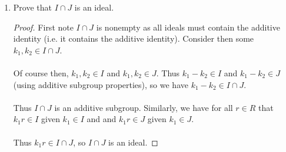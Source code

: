 \documentclass[12pt]{article}
\newenvironment{ex}[2][Exercise]{\begin{trivlist}
\item[\hskip \labelsep {\bfseries #1}\hskip \labelsep {\bfseries #2.}]}{\end{trivlist}}
\begin{document}
\begin{ex}{3}
\begin{enumerate}[label=(\alph*)]
\begin{proof}
        \end{proof}
        \item Prove that $I \cap J$ is an ideal.
        \begin{proof}
            First note $I \cap J$ is nonempty as all ideals must contain the additive identity (i.e. it contains the additive identity). Consider then some $k_1, k_2 \in I \cap J$. \\ \\
            Of course then, $k_1, k_2 \in I$ and $k_1, k_2 \in J$. Thus $k_1 - k_2 \in I$ and $k_1 - k_2 \in J$ (using additive subgroup properties), so we have $k_1 - k_2 \in I \cap J$. \\ \\
            Thus $I \cap J$ is an additive subgroup. Similarly, we have for all $r \in R$ that $k_1r \in I$ given $k_1 \in I$ and and $k_1r \in J$ given $k_1 \in J$. \\ \\
            Thus $k_1r \in I \cap J$, so $I \cap J$ is an ideal.
        \end{proof}
    \end{enumerate}
\end{ex}
\end{document}
